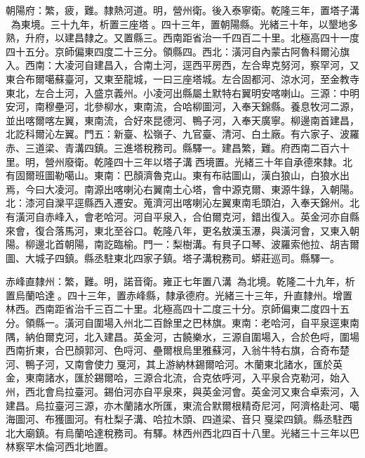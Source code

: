 \begin{pinyinscope}
朝陽府：繁，疲，難。隸熱河道。明，營州衛。後入泰寧衛。乾隆三年，置塔子溝，為東境。三十九年，析置三座塔。四十三年，置朝陽縣。光緒三十年，以墾地多熟，升府，以建昌隸之。又置縣三。西南距省治一千四百二十里。北極高四十一度四十五分。京師偏東四度二十三分。領縣四。西北：潢河自內蒙古阿魯科爾沁旗入。西南：大凌河自建昌入，合南土河，逕西平房西，左合卑克努河，察罕河，又東合布爾噶蘇臺河，又東至龍城，一曰三座塔城。左合固都河、涼水河，至金教寺東北，左合土河，入盛京義州。小凌河出縣屬土默特右翼明安喀喇山。三源：中明安河，南穆壘河，北參柳水，東南流，合哈柳圖河，入奉天錦縣。養息牧河二源，並出喀爾喀左翼，東南流，合好來昆德河、鴨子河，入奉天廣寧。柳邊南首建昌，北訖科爾沁左翼。門五：新臺、松嶺子、九官臺、清河、白土廠。有六家子、波羅赤、三道梁、青溝四鎮。三進塔稅務司。縣驛一。建昌繁，難。府西南二百六十里。明，營州廢衛。乾隆四十三年以塔子溝西境置。光緒三十年自承德來隸。北有固爾班圖勒噶山。東南：巴顏濟魯克山。東有布祜圖山，漢白狼山，白狼水出焉，今曰大凌河。南源出喀喇沁右翼南土心塔，會中源克爾、東源牛錄，入朝陽。北：漆河自灤平逕縣西入遷安。蒐濟河出喀喇沁左翼東南毛頭泊，入奉天錦州。北有潢河自赤峰入，會老哈河。河自平泉入，合伯爾克河，錯出復入。英金河亦自縣來會，復合落馬河，東北至谷口。乾隆八年，更名敖漢玉瀑，與潢河會，又東入朝陽。柳邊北首朝陽，南訖臨榆。門一：梨樹溝。有貝子口琴、波羅索他拉、胡吉爾圖、大城子四鎮。縣丞駐東北四家子鎮。塔子溝稅務司。蟒莊巡司。縣驛一。

赤峰直隸州：繁，難。明，諾音衛。雍正七年置八溝，為北境。乾隆二十九年，析置烏蘭哈達。四十三年，置赤峰縣，隸承德府。光緒三十三年，升直隸州。增置林西。西南距省治千三百二十里。北極高四十二度三十分。京師偏東二度四十五分。領縣一。潢河自圍場入州北二百餘里之巴林旗。東南：老哈河，自平泉逕東南隅，納伯爾克河，北入建昌。英金河，古饒樂水，三源自圍場入，合於色哷，圍場西南折東，合巴顏郭河、色哷河、壘爾根烏里雅蘇河，入翁牛特右旗，合奇布楚河、鴨子河，又南會使力戛河，其上游納林錫爾哈河。木蘭東北諸水，匯於英金，東南諸水，匯於錫爾哈，三源合北流，合克依呼河，入平泉合克勒河，始入州，西北會烏拉臺河。錫伯河亦自平泉來，與英金河會。英金河又東合卓索河，入建昌。烏拉臺河三源，亦木蘭諸水所匯，東流合默爾根精奇尼河，阿濟格赴河、噶海圖河、布獲圖河。有杜梨子溝、哈拉木頭、四道梁、音只戛梁四鎮。縣丞駐西北大廟鎮。有烏蘭哈達稅務司。有驛。林西州西北四百十八里。光緒三十三年以巴林察罕木倫河西北地置。


\end{pinyinscope}

